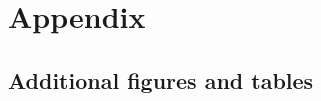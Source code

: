 \appendix
\chapter{Appendix}\label{appendix}
\section{Additional figures and tables}\label{appendix_further_figures}